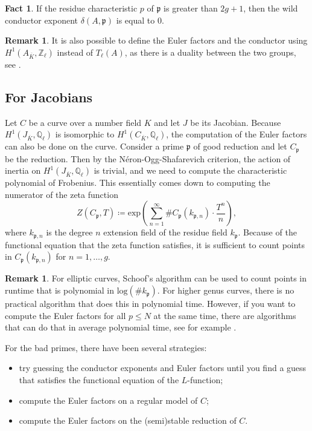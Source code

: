 \documentclass[12pt]{article}
\theoremstyle{definition}
\newtheorem{remark}[theorem]{Remark}
\newtheorem{fact}[theorem]{Fact}
\numberwithin{equation}{subsection}
\newcommand{\Q}{\ensuremath{\mathbb{Q}}}
\newcommand{\Z}{\ensuremath{\mathbb{Z}}}
\begin{document}
\begin{fact}
If the residue characteristic $p$ of $\mathfrak{p}$ is greater than $2g + 1$, then the wild conductor exponent $\delta(A,\mathfrak{p})$ is equal to 0.
\end{fact}

\begin{remark}
It is also possible to define the Euler factors and the conductor using $H^1(A_{\overline{K}}, \Z_\ell)$ instead of $T_{\ell}(A)$, as there is a duality between the two groups, see \cite[Chap.\ 10]{AbVarBook}.
\end{remark}

\subsection{For Jacobians}

Let $C$ be a curve over a number field $K$ and let $J$ be its Jacobian.
Because $H^1(J_{\overline{K}}, \Q_\ell)$ is isomorphic to $H^1(C_{\overline{K}}, \Q_\ell)$, the computation of the Euler factors can also be done on the curve.
Consider a prime $\mathfrak{p}$ of good reduction and let $C_\mathfrak{p}$ be the reduction.
Then by the N\'eron-Ogg-Shafarevich criterion, the action of inertia on $H^1(J_{\overline{K}}, \Q_\ell)$ is trivial, and we need to compute the characteristic polynomial of Frobenius. This essentially comes down to computing the numerator of the zeta function
$$Z(C_\mathfrak{p}, T) \coloneqq \mathrm{exp}\!\left( \sum_{n = 1}^\infty \# C_\mathfrak{p}(k_{\mathfrak{p},n}) \cdot \frac{T^n}{n} \right),$$
where $k_{\mathfrak{p},n}$ is the degree $n$ extension field of the residue field $k_\mathfrak{p}$.
Because of the functional equation that the zeta function satisfies, it is sufficient to count points in $C_\mathfrak{p}(k_{\mathfrak{p},n})$ for $n = 1, \ldots, g$.

\begin{remark}
For elliptic curves, Schoof's algorithm can be used to count points in runtime that is polynomial in $\mathrm{log}(\# k_{\mathfrak{p}} )$.
For higher genus curves, there is no practical algorithm that does this in polynomial time.
However, if you want to compute the Euler factors for all $p \leq N$ at the same time, there are algorithms that can do that in average polynomial time, see for example \cite{HarveySutherland}.
\end{remark}

For the bad primes, there have been several strategies:\\[-0.9cm]
\begin{itemize}\itemsep0pt
\item try guessing the conductor exponents and Euler factors until you find a guess that satisfies the functional equation of the $L$-function;
\item compute the Euler factors on a regular model of $C$;
\item compute the Euler factors on the (semi)stable reduction of $C$.
\end{itemize}
\end{document}

